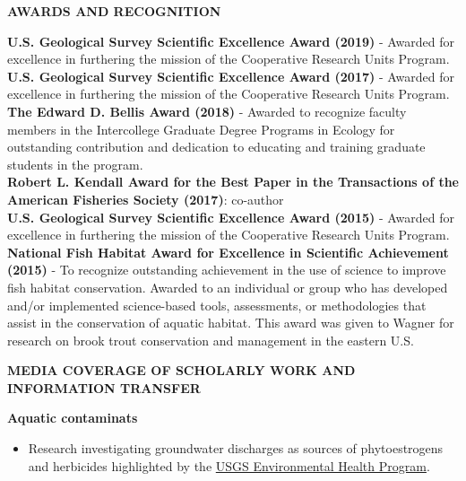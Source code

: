 \documentclass[10pt]{article}
\begin{document}
\begin{flushleft}
\centerline {\bf{AWARDS AND RECOGNITION}}

\vspace{5pt}
{\bf U.S. Geological Survey Scientific Excellence Award (2019)} - Awarded for excellence in furthering the mission of the Cooperative Research Units Program.\\
\vspace{5pt}
{\bf U.S. Geological Survey Scientific Excellence Award (2017)} - Awarded for excellence in furthering the mission of the Cooperative Research Units Program.\\
\vspace{5pt}
{\bf The Edward D. Bellis Award (2018)} - Awarded to recognize faculty members in the Intercollege Graduate Degree Programs in Ecology for outstanding contribution and dedication to educating and training graduate students in the program.\\
\vspace{5pt}
\textbf{Robert L. Kendall Award for the Best Paper in the Transactions of the American Fisheries Society (2017)}: co-author\\
\vspace{5pt}
{\bf U.S. Geological Survey Scientific Excellence Award (2015)} - Awarded for excellence in furthering the mission of the Cooperative Research Units Program.\\
\vspace{5pt}
{\bf National Fish Habitat Award for Excellence in Scientific Achievement  (2015)} - To recognize outstanding achievement in the use of science to improve fish habitat conservation. Awarded to an individual or group who has developed and/or implemented science-based tools, assessments, or methodologies that assist in the conservation of aquatic habitat. This award was given to Wagner for research on brook trout conservation and management in the eastern U.S.\\

\vspace{5pt}
\vspace{6pt}
\centerline {\bf{MEDIA COVERAGE OF SCHOLARLY WORK AND INFORMATION TRANSFER}}
\vspace{5pt}

\textbf{Aquatic contaminats}\\
\begin{itemize}
\item Research investigating groundwater discharges as sources of phytoestrogens and herbicides highlighted by the  \href{https://www.usgs.gov/ecosystems/environmental-health-program/science/groundwater-discharge-a-pathway-phytoestrogen-and?utm_source=Newsletter&utm_medium=Email&utm_campaign=geohealthusgs-newsletter-july-2021&utm_term=Title&qt-science_center_objects=0#qt-science_center_objects}{USGS Environmental Health Program}.
\end{itemize}


\end{flushleft}
\end{document}
